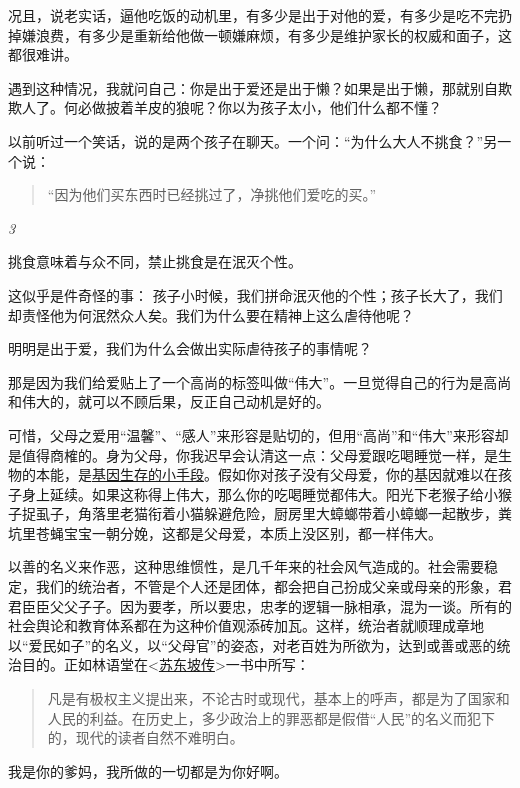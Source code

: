 \documentclass[twoside,openright,headings=optiontohead]{ctexbook} %
\begin{document}
{况且，说老实话，逼他吃饭的动机里，有多少是出于对他的爱，有多少是吃不完扔掉嫌浪费，有多少是重新给他做一顿嫌麻烦，有多少是维护家长的权威和面子，这都很难讲。

遇到这种情况，我就问自己：你是出于爱还是出于懒？如果是出于懒，那就别自欺欺人了。何必做披着羊皮的狼呢？你以为孩子太小，他们什么都不懂？

以前听过一个笑话，说的是两个孩子在聊天。一个问：``为什么大人不挑食？''另一个说：

\begin{quote}
``因为他们买东西时已经挑过了，净挑他们爱吃的买。''
\end{quote}

\emph{3}

挑食意味着与众不同，禁止挑食是在泯灭个性。

这似乎是件奇怪的事：
孩子小时候，我们拼命泯灭他的个性；孩子长大了，我们却责怪他为何泯然众人矣。我们为什么要在精神上这么虐待他呢？

明明是出于爱，我们为什么会做出实际虐待孩子的事情呢？

那是因为我们给爱贴上了一个高尚的标签叫做``伟大''。一旦觉得自己的行为是高尚和伟大的，就可以不顾后果，反正自己动机是好的。

可惜，父母之爱用``温馨''、``感人''来形容是贴切的，但用``高尚''和``伟大''来形容却是值得商榷的。身为父母，你我迟早会认清这一点：父母爱跟吃喝睡觉一样，是生物的本能，是\href{http://dapengde.com/archives/19023}{基因生存的小手段}。假如你对孩子没有父母爱，你的基因就难以在孩子身上延续。如果这称得上伟大，那么你的吃喝睡觉都伟大。阳光下老猴子给小猴子捉虱子，角落里老猫衔着小猫躲避危险，厨房里大蟑螂带着小蟑螂一起散步，粪坑里苍蝇宝宝一朝分娩，这都是父母爱，本质上没区别，都一样伟大。

以善的名义来作恶，这种思维惯性，是几千年来的社会风气造成的。社会需要稳定，我们的统治者，不管是个人还是团体，都会把自己扮成父亲或母亲的形象，君君臣臣父父子子。因为要孝，所以要忠，忠孝的逻辑一脉相承，混为一谈。所有的社会舆论和教育体系都在为这种价值观添砖加瓦。这样，统治者就顺理成章地以``爱民如子''的名义，以``父母官''的姿态，对老百姓为所欲为，达到或善或恶的统治目的。正如林语堂在\textless{}\href{http://dapengde.com/archives/17477}{苏东坡传}\textgreater{}一书中所写：

\begin{quote}
凡是有极权主义提出来，不论古时或现代，基本上的呼声，都是为了国家和人民的利益。在历史上，多少政治上的罪恶都是假借``人民''的名义而犯下的，现代的读者自然不难明白。
\end{quote}

我是你的爹妈，我所做的一切都是为你好啊。

}
\end{document}
